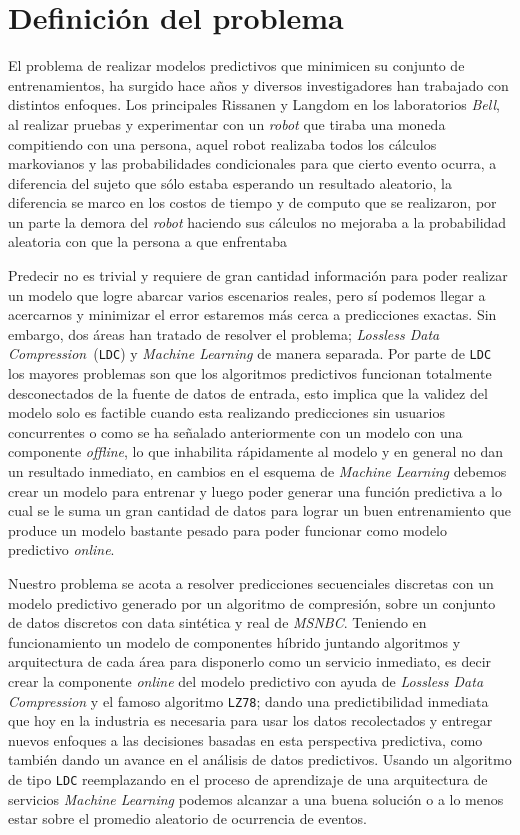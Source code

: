

\section{Definición del problema}


El problema de realizar modelos predictivos que minimicen su conjunto de entrenamientos, ha surgido hace años y diversos investigadores han trabajado con distintos enfoques. Los principales Rissanen\cite{Rissanen1983} y Langdom\cite{Langdon1983} en los laboratorios \emph{Bell}, al realizar pruebas y experimentar con un \emph{robot} que tiraba una moneda compitiendo con una persona, aquel robot realizaba todos los cálculos {markovianos} y las probabilidades condicionales para que cierto evento ocurra, a diferencia del sujeto que sólo estaba esperando un resultado aleatorio, la diferencia se marco en los costos de tiempo y de computo que se realizaron, por un parte la demora del \emph{robot} haciendo sus cálculos no mejoraba a la probabilidad aleatoria con que la persona a que enfrentaba 

Predecir no es trivial y requiere de gran cantidad información para poder realizar un modelo que logre abarcar varios escenarios reales, pero sí podemos llegar a acercarnos y minimizar el error  estaremos más cerca a predicciones exactas. Sin embargo, dos áreas han tratado de resolver el problema;  \emph{Lossless Data Compression}~(\texttt{LDC}) y \emph{Machine Learning} de manera separada. Por parte de \texttt{LDC} los mayores problemas son que los algoritmos predictivos  funcionan totalmente desconectados de la fuente de datos de entrada, esto implica que la validez del modelo solo es factible cuando esta realizando predicciones sin usuarios concurrentes o como se ha señalado anteriormente con un modelo con una componente \emph{offline}, lo que inhabilita rápidamente al modelo y en general no dan un resultado inmediato, en cambios en el esquema de \emph{Machine Learning} debemos crear un modelo para entrenar y luego poder generar una función predictiva a lo cual se le suma un gran cantidad de datos para lograr un buen entrenamiento que produce un modelo bastante pesado para poder funcionar como modelo predictivo \emph{online}. 

Nuestro problema se acota a resolver predicciones secuenciales discretas con un modelo predictivo generado por un algoritmo de compresión, sobre un conjunto de datos discretos con data sintética y real de \emph{MSNBC}\cite{Claude2014}. Teniendo en funcionamiento un modelo de componentes híbrido juntando algoritmos y arquitectura de cada área para disponerlo como un servicio inmediato, es decir crear la componente \emph{online} del modelo predictivo con ayuda de \emph{Lossless Data Compression} y el famoso algoritmo \texttt{LZ78}; dando una predictibilidad inmediata que hoy en la industria es necesaria para usar los datos recolectados y entregar nuevos enfoques a las decisiones basadas en esta perspectiva predictiva, como también dando un avance en el análisis de datos predictivos. Usando un algoritmo de tipo \texttt{LDC} reemplazando en el proceso de aprendizaje de una arquitectura de  servicios  \emph{Machine Learning} podemos alcanzar a una buena solución o a lo menos estar sobre el promedio aleatorio de ocurrencia de eventos.

